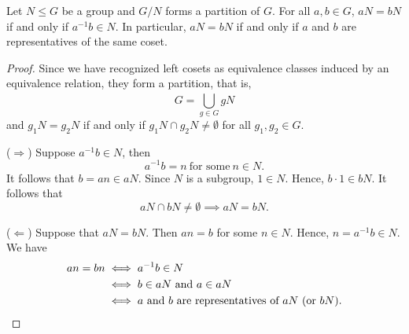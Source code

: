 \begin{prop}[4]
   Let \( N \leq G  \) be a group and \( G / N  \) forms a partition of \( G  \). For all \( a,b \in G  \), \( a N = b N  \) if and only if \( a^{-1} b \in N  \). In particular, \( aN = b N  \) if and only if \( a \) and \( b  \) are representatives of the same coset.
\end{prop}
\begin{proof}
Since we have recognized left cosets as equivalence classes induced by an equivalence relation, they form a partition, that is, 
\[  G = \bigcup_{ g \in G  }^{   }  g N  \]
and \( {g}_{1} N = {g}_{2} N  \) if and only if \( {g}_{1} N \cap {g}_{2} N \neq \emptyset \) for all \( {g}_{1}, {g}_{2} \in G  \). 

(\( \Longrightarrow \)) Suppose \( a^{-1}b \in N  \), then 
\[  a^{-1} b = n  \ \text{for some} \ n \in N.  \]
It follows that \( b = an \in a N  \). Since \( N  \) is a subgroup, \( 1 \in N  \). Hence, \( b \cdot 1 \in bN  \). It follows that 
\[  aN \cap bN \neq \emptyset \implies aN = bN. \]

(\( \Longleftarrow \)) Suppose that \( aN = bN  \). Then \( an = b  \) for some \( n \in N  \). Hence, \( n = a^{-1} b \in N  \). We have 
\begin{align*}
    an = bn &\iff a^{-1}b \in N \\
            &\iff b \in aN \ \text{and} \ a \in a N \\
            &\iff a \ \text{and} \ b \ \text{are representatives of} \ aN \ \text{(or \( bN \))}.
\end{align*}
\end{proof}

